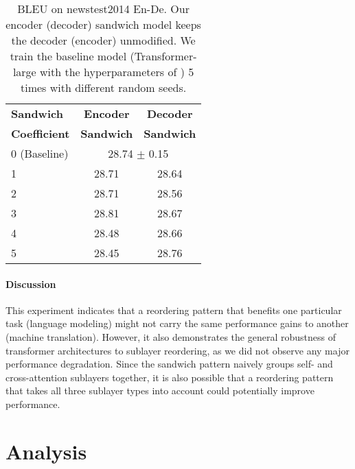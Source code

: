 \documentclass[11pt,a4paper]{article}
\begin{document}
\begin{table}[!t]
\centering
\small


\begin{tabular}{lcc}
\toprule
\textbf{Sandwich} & \textbf{Encoder} &  \textbf{Decoder} \\
\textbf{Coefficient} & \textbf{Sandwich} &  \textbf{Sandwich } \\
\midrule
0 (Baseline)                                                                  & \multicolumn{2}{c}{28.74 $\pm$ 0.15}  \\ 
\midrule
1                                                                  &  28.71       & 28.64     \\ 
2                                                                  &  28.71       & 28.56     \\ 
3                                                                  &  28.81       & 28.67     \\ 
4                                                                  &  28.48       & 28.66     \\ 
5                                                                  &  28.45       & 28.76     \\ \bottomrule
\end{tabular}

\caption{BLEU on newstest2014 En-De. Our encoder (decoder) sandwich model keeps the decoder (encoder) unmodified. We train the baseline model (Transformer-large with the hyperparameters of \citealp{scalingnmt}) 5 times with different random seeds.}
\label{tab.allnmt}
\end{table}


\paragraph{Discussion}
This experiment indicates that a reordering pattern that benefits one particular task (language modeling) might not carry the same performance gains to another (machine translation).
However, it also demonstrates the general robustness of transformer architectures to sublayer reordering, as we did not observe any major performance degradation. 
Since the sandwich pattern naively groups self- and cross-attention sublayers together, it is also possible that a reordering pattern that takes all three sublayer types into account could potentially improve performance.
 \section{Analysis}
\end{document}
